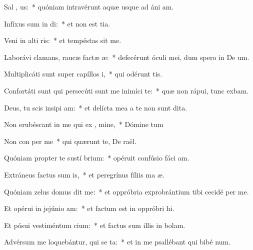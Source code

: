 \item Sal  , us:~* quóniam intravérunt aquæ usque ad áni am.
\item Infíxus sum in  di:~* et non est tia.
\item Veni in alti ris:~* et tempéstas sit me.
\item Laborávi clamans, raucæ factæ   æ:~* defecérunt óculi mei, dum spero in De um.
\item Multiplicáti sunt super capíllos  i,~* qui odérunt  tis.
\item Confortáti sunt qui persecúti sunt me inimíci  te:~* quæ non rápui, tunc exbam.
\item Deus, tu scis insipi am:~* et delícta mea a te non sunt dita.
\item Non erubéscant in me qui ex , mine,~* Dómine tum
\item Non con per me~* qui quærunt te, De raël.
\item Quóniam propter te sustí brium:~* opéruit confúsio fáci am.
\item Extráneus factus sum  is,~* et peregrínus fíliis ma æ.
\item Quóniam zelus domus  dit me:~* et oppróbria exprobrántium tibi cecidé per me.
\item Et opérui in jejúnio  am:~* et factum est in oppróbri hi.
\item Et pósui vestiméntum  cium:~* et factus sum illis in bolam.
\item Advérsum me loquebántur, qui se  ta:~* et in me psallébant qui bibé num.
